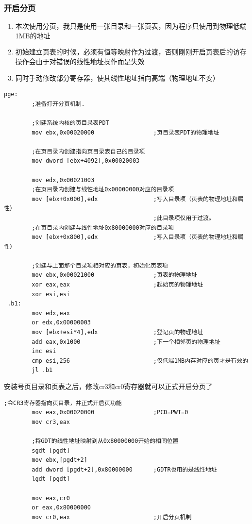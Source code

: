 \documentclass[a4paper,11pt,UTF8]{ctexart}
\begin{document}
			
		\subsubsection{开启分页}
			\begin{enumerate}
				\item 本次使用分页，我只是使用一张目录和一张页表，因为程序只使用到物理低端1MB的地址
				\item 初始建立页表的时候，必须有恒等映射作为过渡，否则刚刚开启页表后的访存操作会由于对错误的线性地址操作而是失效
				\item 同时手动修改部分寄存器，使其线性地址指向高端（物理地址不变）
			\end{enumerate}
	\begin{lstlisting}[caption={手动完善页目录和页表},tabsize=4,basicstyle=\footnotesize,captionpos=b]
		pge:
		;准备打开分页机制.
			 
		;创建系统内核的页目录表PDT
		mov ebx,0x00020000                 ;页目录表PDT的物理地址
		
		;在页目录内创建指向页目录表自己的目录项
		mov dword [ebx+4092],0x00020003 

		mov edx,0x00021003                 
		;在页目录内创建与线性地址0x00000000对应的目录项
		mov [ebx+0x000],edx                ;写入目录项（页表的物理地址和属性）      
										   ;此目录项仅用于过渡。
		;在页目录内创建与线性地址0x80000000对应的目录项
		mov [ebx+0x800],edx                ;写入目录项（页表的物理地址和属性）

		;创建与上面那个目录项相对应的页表，初始化页表项 
		mov ebx,0x00021000                 ;页表的物理地址
		xor eax,eax                        ;起始页的物理地址 
		xor esi,esi
 .b1:       
		mov edx,eax
		or edx,0x00000003                                                      
		mov [ebx+esi*4],edx                ;登记页的物理地址
		add eax,0x1000                     ;下一个相邻页的物理地址 
		inc esi
		cmp esi,256                        ;仅低端1MB内存对应的页才是有效的 
		jl .b1
	\end{lstlisting}

	安装号页目录和页表之后，修改cr3和cr0寄存器就可以正式开启分页了
	\begin{lstlisting}[caption={开启 paging},tabsize=4,basicstyle=\footnotesize,captionpos=b]
		;令CR3寄存器指向页目录，并正式开启页功能 
		mov eax,0x00020000                 ;PCD=PWT=0
		mov cr3,eax

		;将GDT的线性地址映射到从0x80000000开始的相同位置 
		sgdt [pgdt]
		mov ebx,[pgdt+2]
		add dword [pgdt+2],0x80000000      ;GDTR也用的是线性地址
		lgdt [pgdt]

		mov eax,cr0
		or eax,0x80000000
		mov cr0,eax                        ;开启分页机制
	\end{lstlisting}
\end{document}
